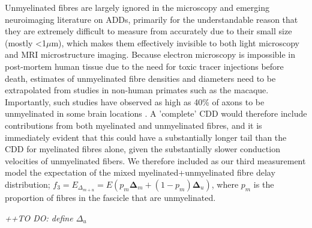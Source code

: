 Unmyelinated fibres are largely ignored in the microscopy and emerging neuroimaging literature on ADDs, primarily for the understandable reason that they are extremely difficult to measure from accurately due to their small size (mostly <1$\mu$m), which makes them effectively invisible to both light microscopy and MRI microstructure imaging.  Because electron microscopy is impossible in post-mortem human tissue due to the need for toxic tracer injections before death, estimates of unmyelinated fibre densities and diameters need to be extrapolated from studies in non-human primates such as the macaque. Importantly, such studies have observed as high as 40\% of axons to be unmyelinated in some brain locations . A 'complete' CDD would therefore include contributions from both myelinated and unmyelinated fibres, and it is immediately evident that this could have a substantially longer tail than the CDD for myelinated fibres alone, given the substantially slower conduction velocities of unmyelinated fibers. We therefore included as our third measurement model the expectation of the mixed myelinated+unmyelinated fibre delay distribution; $f_{3} = E_{\Delta_{m+u}} = E(p_m  \mathbf{\Delta}_{m} + (1-p_m) \mathbf{\Delta}_{u}) $, where $p_m$ is the proportion of fibres in the fascicle that are unmyelinated. 

\textit{++TO DO: define $\Delta_u$}






